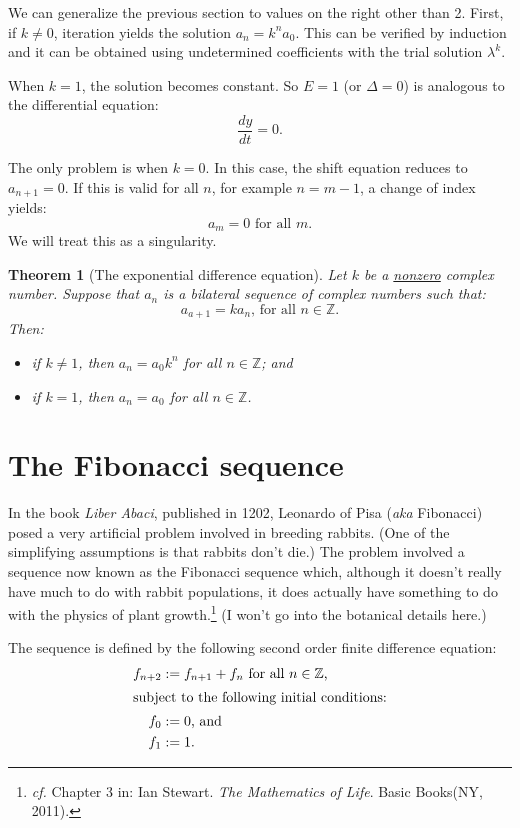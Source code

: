 \documentclass[12pt,letterpaper,reqno]{amsart}
\newtheorem{theorem}{Theorem}
\numberwithin{equation}{section}
\numberwithin{theorem}{section}
\numberwithin{table}{section}
\begin{document}
We can generalize the previous section to values on the right other than 2.  First, if $k\neq 0$, iteration yields the solution $a_n=k^na_0$.  This can be verified by induction and it can be obtained using undetermined coefficients with the trial solution $\lambda^k$.

When $k=1$, the solution becomes constant.  So $E=1$ (or $\Delta=0$) is analogous to the differential equation:
\[
	\frac{dy}{dt} = 0
	\text{.}
\]

The only problem is when $k=0$.  In this case, the shift equation reduces to $a_{n+1}=0$.  If this is valid for all $n$, for example $n=m-1$, a change of index yields:
\[
	a_m = 0
	\text{ for all $m$.}
\]
We will treat this as a singularity.

\begin{theorem}[The exponential difference equation]
	Let $k$ be a \underline{nonzero} complex number.  Suppose that $a_n$ is a bilateral sequence of complex numbers such that:
	\[
		a_{a+1} = ka_n\text{, for all $n\in\mathbb{Z}$.} 
	\]
	Then:
	\begin{itemize}
		\item if $k\neq1$, then $a_n=a_0 k^n$ for all $n\in\mathbb{Z}$; and
		\item if $k=1$, then $a_n=a_0$ for all $n\in\mathbb{Z}$.
	\end{itemize}
\end{theorem}

\section{The Fibonacci sequence}

In the book \emph{Liber Abaci}, published in 1202, Leonardo of Pisa (\emph{aka} Fibonacci) posed a very artificial problem involved in breeding rabbits.  (One of the simplifying assumptions is that rabbits don't die.)  The problem involved a sequence now known as the Fibonacci sequence which, although it doesn't really have much to do with rabbit populations, it does actually have something to do with the physics of plant growth.\footnote{\emph{cf.} Chapter 3 in: Ian Stewart. \emph{The Mathematics of Life}. Basic Books(NY, 2011).}  (I won't go into the botanical details here.)

The sequence is defined by the following second order finite difference equation:
\begin{align}
	f_{n+2} &:= f_{n+1} + f_n
	\text{ for all $n\in\mathbb{Z}$,} \\
\intertext{subject to the following initial conditions:}
	f_0 &:= 0 \text{, and} \\
	f_1 &:= 1 \text{.}
\end{align}
\end{document}
